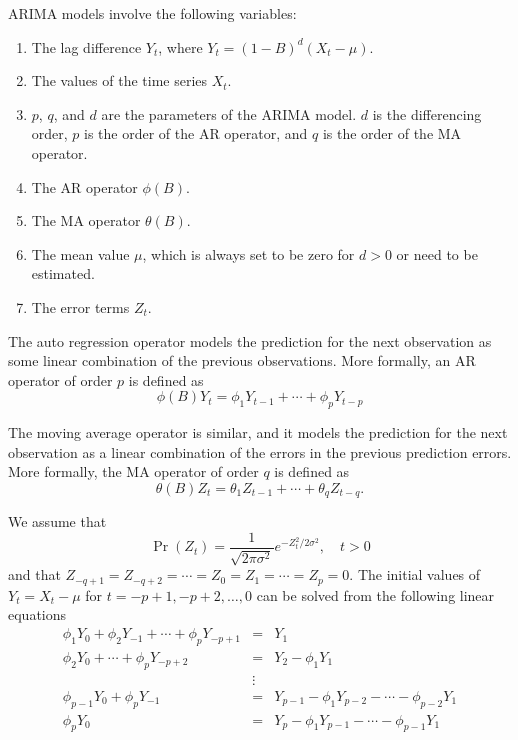 \documentclass[english,10pt]{llncs}
\begin{document}
ARIMA models involve the following variables:
\begin{enumerate}
   \item The lag difference $Y_{t}$, where  $Y_{t} = {(1-B)}^{d}(X_{t} - \mu)$.
    \item The values of the time series $X_t$.
    \item $p$, $q$, and $d$ are the parameters of the ARIMA model.
      $d$ is the differencing order, $p$ is the order of the AR
      operator, and $q$ is the order of the MA operator.
    \item The AR operator $\phi(B)$.
    \item The MA operator $\theta(B)$.
    \item The mean value $\mu$, which is always set to be zero for
      $d>0$ or need to be estimated.
    \item The error terms $Z_t$.
\end{enumerate}

The  auto regression operator models the prediction for the next
observation  as some linear combination of the previous observations.
More formally, an AR operator of order $p$ is defined as
\begin{equation}
\phi(B) Y_t= \phi_1 Y_{t-1}   + \cdots +  \phi_{p} Y_{t-p}
\end{equation}

The moving average operator is similar, and it models the prediction
for the next observation as a linear combination of the errors in the
previous prediction errors.  More formally, the MA operator of order
$q$ is defined as
\begin{equation}
\theta(B) Z_t =   \theta_{1} Z_{t-1} + \cdots + \theta_{q} Z_{t-q}.
\end{equation}

We assume that
\begin{equation}
\Pr(Z_t) = \frac{1}{\sqrt{2 \pi \sigma^2}} e^{-Z^2_t/2 \sigma^2}, \quad t > 0
\end{equation}
and that  $Z_{-q+1} = Z_{-q+2} = \cdots = Z_0 = Z_1 = \cdots = Z_p =
0$. The initial values of $Y_t=X_t-\mu$ for $t=-p+1, -p+2, \dots,
0$ can be solved from the following linear equations
\begin{eqnarray}
\phi_1 Y_0 + \phi_2 Y_{-1} + \cdots + \phi_p Y_{-p+1} &=& Y_1 \nonumber\\
\phi_2 Y_0 + \cdots + \phi_p Y_{-p+2} &=& Y_2 - \phi_1 Y_1  \nonumber\\
&\vdots& \nonumber\\
\phi_{p-1} Y_0 + \phi_p Y_{-1} &=& Y_{p-1} - \phi_1 Y_{p-2} - \cdots -
\phi_{p-2} Y_1 \nonumber \\
\phi_p Y_0  &=& Y_p - \phi_1 Y_{p-1} - \cdots - \phi_{p-1} Y_{1} \label{eq:init_Y}
\end{eqnarray}
\end{document}
